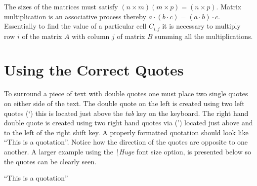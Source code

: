 The sizes of the matrices must satisfy $(n \times m)(m \times p) =
(n \times p)$. Matrix multiplication is an associative process
thereby $a\cdot(b \cdot c) = (a \cdot b) \cdot c$. Essentially to
find the value of a particular cell $C_{i,j}$ it is necessary to
multiply row $i$ of the matrix $A$ with column $j$ of matrix $B$
summing all the multiplications.

\section{Using the Correct Quotes}
To surround a piece of text with double quotes one must place two single quotes on either side of the text. The double quote on the left is created using two left quotes (\lq) this is located just above the \emph{tab} key on the keyboard. The right hand double quote is created using two right hand quotes via (\rq) located just above and to the left of the right shift key. A properly formatted quotation should look like ``This is a quotation''. Notice how the direction of the quotes are opposite to one another. A larger example using the \emph{\textbackslash Huge} font size option, is presented below so the quotes can be clearly seen.

\begin{center}
\Huge{``This is a quotation''}
\end{center}


